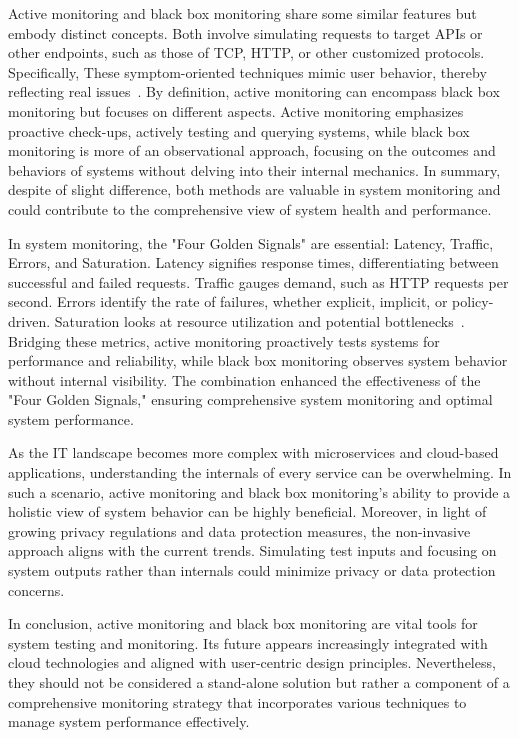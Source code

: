 Active monitoring and black box monitoring share some similar features but embody distinct concepts. Both involve simulating requests to target APIs or other endpoints, such as those of \ac{TCP}, \ac{HTTP}, or other customized protocols. Specifically, These symptom-oriented techniques mimic user behavior, thereby reflecting real issues~\parencite{beyerSiteReliabilityEngineering2016}. By definition, active monitoring can encompass black box monitoring but focuses on different aspects. Active monitoring emphasizes proactive check-ups, actively testing and querying systems, while black box monitoring is more of an observational approach, focusing on the outcomes and behaviors of systems without delving into their internal mechanics. In summary, despite of slight difference, both methods are valuable in system monitoring and could contribute to the comprehensive view of system health and performance. 

In system monitoring, the "Four Golden Signals" are essential: Latency, Traffic, Errors, and Saturation. Latency signifies response times, differentiating between successful and failed requests. Traffic gauges demand, such as HTTP requests per second. Errors identify the rate of failures, whether explicit, implicit, or policy-driven. Saturation looks at resource utilization and potential bottlenecks~\parencite{beyerSiteReliabilityEngineering2016}. Bridging these metrics, active monitoring proactively tests systems for performance and reliability, while black box monitoring observes system behavior without internal visibility. The combination enhanced the effectiveness of the "Four Golden Signals," ensuring comprehensive system monitoring and optimal system performance.

As the IT landscape becomes more complex with microservices and cloud-based applications, understanding the internals of every service can be overwhelming. In such a scenario, active monitoring and black box monitoring's ability to provide a holistic view of system behavior can be highly beneficial. Moreover, in light of growing privacy regulations and data protection measures, the non-invasive approach aligns with the current trends. Simulating test inputs and focusing on system outputs rather than internals could minimize privacy or data protection concerns. 

In conclusion, active monitoring and black box monitoring are vital tools for system testing and monitoring. Its future appears increasingly integrated with cloud technologies and aligned with user-centric design principles. Nevertheless, they should not be considered a stand-alone solution but rather a component of a comprehensive monitoring strategy that incorporates various techniques to manage system performance effectively. 

